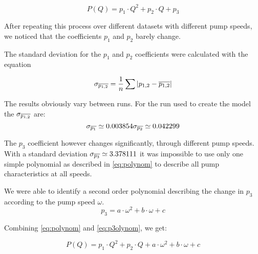 \begin{equation}
	 P(Q) = p_1 \cdot Q^2 + p_2 \cdot Q + p_3
	 \label{eq:polynom}
\end{equation}

After repeating this process over different datasets with different pump speeds,
we noticed that the coefficients $p_1$ and $p_2$ barely change.

The standard deviation for the $p_1$ and $p_2$ coefficients were calculated with the equation 

\begin{equation}
	\sigma_{\overline{p_{1,2}}} = \dfrac{1}{n}\sum |p_{1,2}-\overline{p_{1,2}}|
	\label{eq:avedev}
\end{equation}

The results obviously vary between runs. For the run used to create the model the $\sigma_{\overline{p_{1,2}}}$ are:
\begin{equation}
	\sigma_{\mean{p_1}} \simeq 0.003854$$
	
	$$\sigma_{\mean{p_2}} \simeq 0.042299
\end{equation}

The $p_3$ coefficient however changes significantly, through different pump speeds.
With a standard deviation $\sigma_{\overline{p_3}} \simeq 3.378111$ it was impossible to use only one simple polynomial as described in 
\ref{eq:polynom} to describe all pump characteristics at all speeds.

We were able to identify a second order polynomial describing the change in $p_3$ according to the pump speed $\omega$.
\begin{equation}
	 p_3 = a \cdot \omega^2 + b \cdot \omega + c
	 \label{eq:p3olynom}
\end{equation}

Combining \ref{eq:polynom} and \ref{eq:p3olynom}, we get:

\begin{equation}
	P(Q) = p_1 \cdot Q^2 + p_2 \cdot Q + a \cdot \omega^2 + b \cdot \omega + c 
\end{equation}
